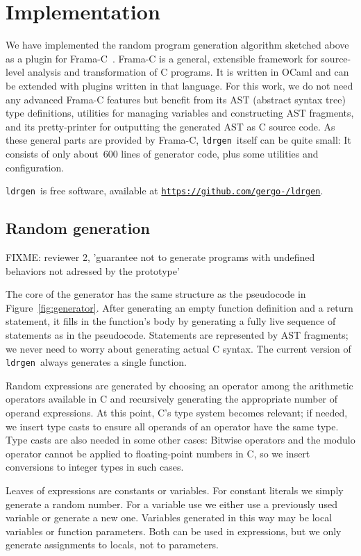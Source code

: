 \documentclass{llncs}
\newcommand\ldrgen{\texttt{ldrgen}}
\begin{document}
\section{Implementation}

We have implemented the random program generation algorithm sketched above
as a plugin for Frama-C~\cite{frama-c}. Frama-C is a general, extensible
framework for source-level analysis and transformation of C programs. It is
written in OCaml and can be extended with plugins written in that language.
For this work, we do not need any advanced Frama-C features but benefit from
its AST (abstract syntax tree) type definitions, utilities for managing
variables and constructing AST fragments, and its pretty-printer for
outputting the generated AST as C source code. As these general parts are
provided by Frama-C, \ldrgen\ itself can be quite small: It consists of only
about~600 lines of generator code, plus some utilities and configuration.

\ldrgen\ is free software, available at
\texttt{\url{https://github.com/gergo-/ldrgen}}.

\subsection{Random generation}

FIXME: reviewer 2, 'guarantee not to generate programs with undefined
behaviors not adressed by the prototype'

The core of the generator has the same structure as the pseudocode in
Figure~\ref{fig:generator}. After generating an empty function definition
and a return statement, it fills in the function's body by generating a
fully live sequence of statements as in the pseudocode. Statements are
represented by AST fragments; we never need to worry about generating actual
C syntax. The current version of \ldrgen\ always generates a single
function.

Random expressions are generated by choosing an operator among the
arithmetic operators available in C and recursively generating the
appropriate number of operand expressions. At this point, C's type system
becomes relevant; if needed, we insert type casts to ensure all operands of
an operator have the same type. Type casts are also needed in some other
cases: Bitwise operators and the modulo operator cannot be applied to
floating-point numbers in C, so we insert conversions to integer types in
such cases.

Leaves of expressions are constants or variables. For constant literals we
simply generate a random number. For a variable use we either use a
previously used variable or generate a new one. Variables generated in
this way may be local variables or function parameters. Both can be used in
expressions, but we only generate assignments to locals, not to parameters.
\end{document}
